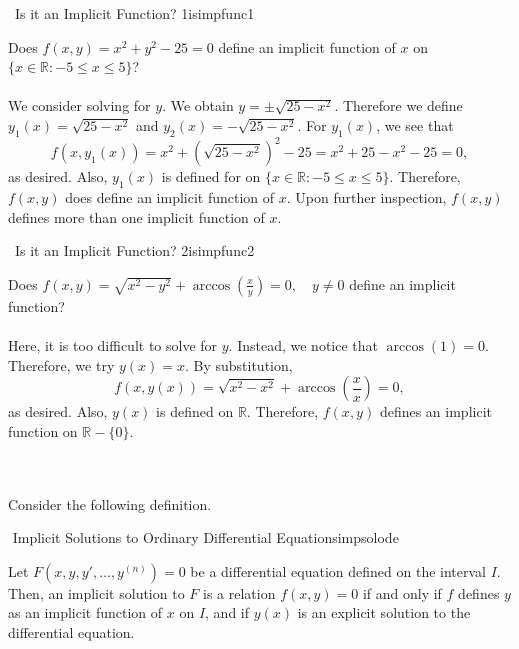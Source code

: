         \begin{example}{\Difficulty\,\Difficulty\,\,Is it an Implicit Function? 1}{isimpfunc1}
            
            Does \(f(x,y)=x^2+y^2-25=0\) define an implicit function of \(x\) on \(\{x\in\mathbb{R}:-5\leq x\leq 5\}\)?
            \\
            \\
            We consider solving for \(y\). We obtain \(y=\pm\sqrt{25-x^2}\). Therefore we define \(y_1(x)=\sqrt{25-x^2}\) and \(y_2(x)=-\sqrt{25-x^2}\). For \(y_1(x)\), we see that
            \begin{equation*}
                f(x,y_1(x))=x^2+(\sqrt{25-x^2})^2-25=x^2+25-x^2-25=0,
            \end{equation*}
            as desired. Also, \(y_1(x)\) is defined for on \(\{x\in\mathbb{R}:-5\leq x\leq 5\}\). Therefore, \(f(x,y)\) does define an implicit function of \(x\). Upon further inspection, \(f(x,y)\) defines more than one implicit function of \(x\).

        \end{example}
        \pagebreak
        \begin{example}{\Difficulty\,\Difficulty\,\,Is it an Implicit Function? 2}{isimpfunc2}
            
            Does \(f(x,y)=\sqrt{x^2-y^2}+\arccos\left(\frac{x}{y}\right)=0,\quad y\neq0\) define an implicit function?
            \\
            \\
            Here, it is too difficult to solve for \(y\). Instead, we notice that \(\arccos(1)=0\). Therefore, we try \(y(x)=x\). By substitution,
            \begin{equation*}
                f(x,y(x))=\sqrt{x^2-x^2}+\arccos\left(\frac{x}{x}\right)=0,
            \end{equation*}
            as desired. Also, \(y(x)\) is defined on \(\mathbb{R}\). Therefore, \(f(x,y)\) defines an implicit function on \(\mathbb{R}-\{0\}\).

        \end{example}
        \vphantom
        \\
        \\
        Consider the following definition.
        \begin{definition}{\Stop\,\,Implicit Solutions to Ordinary Differential Equations}{impsolode}
            
            Let \(F(x,y,y',\ldots,y^{(n)})=0\) be a differential equation defined on the interval \(I\). Then, an implicit solution to \(F\) is a relation \(f(x,y)=0\) if and only if \(f\) defines \(y\) as an implicit function of \(x\) on \(I\), and if \(y(x)\) is an explicit solution to the differential equation.

        \end{definition}
